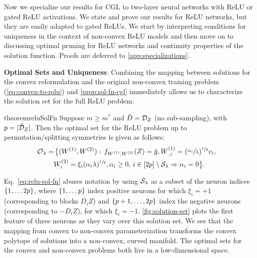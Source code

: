 


Now we specialize our results for CGL to two-layer neural networks
with ReLU or gated ReLU activations.
We state and prove our results for ReLU networks, but they are easily
adapted to gated ReLUs.
We start by interpreting conditions for uniqueness in the context
of non-convex ReLU models and then move on to discussing optimal pruning
for ReLU networks and continuity properties of the solution function.
Proofs are deferred to \cref{app:specializations}.

\textbf{Optimal Sets and Uniqueness}:
Combining the mapping between solutions for the convex reformulation
and the original non-convex training problem (\cref{eq:convex-to-relu})
and \cref{prop:sol-fn-cgl}
immediately allows us to characterize the solution set
for the full ReLU problem:
\begin{restatable}{theorem}{reluSolFn}\label{cor:relu-sol-fn}
    Suppose \( m \geq m^* \) and \( \tilde D = \mathcal{D}_Z \) (no sub-sampling),
    with \( p = |\tilde {\mathcal{D}}_Z| \).
    Then the optimal set for the ReLU problem up to permutation/splitting
    symmetries is given as follows:
    \begin{equation}\label{eq:relu-sol-fn}
        \begin{aligned}
            \hspace{-0.5em} \mathcal{O}_\lambda
            = & \,
            \big\{
            (W^{(1)},  W^{(2)}) :
            \, f_{W^{(1)}, W^{(2)}}(Z)  =  \hat y,
            W^{(1)}_{\cdot, i} = (\sfrac{\alpha_{i}}{\lambda})^{\sfrac{1}{2}} v_i, \\
              & W^{(2)}_{i} = \xi_i (\alpha_i \lambda)^{\sfrac{1}{2}},
            \alpha_i \geq 0, \, i \in [2p] \setminus \mathcal{S}_\lambda \Rightarrow \alpha_i = 0
            \big\}.
        \end{aligned}
    \end{equation}
\end{restatable}
Eq.~\eqref{eq:relu-sol-fn} abuses notation by using $\mathcal{S}_\lambda$ as
a subset of the neuron indices \( \left\{1, \ldots 2p\right\} \), where
\( \left\{1, \ldots p\right\} \) index positive neurons for which \( \xi_i = +1 \)
(corresponding to blocks \( D_i Z \))
and \( \left\{p+1, \ldots, 2p\right\} \) index the negative neurons (corresponding to \(
- D_i Z \)), for which \( \xi_i = -1 \).
\cref{fig:solution-set} plots the first feature of three neurons
as they vary over this solution set.
We see that the mapping from convex to non-convex parameterization transforms
the convex polytope of solutions into a non-convex, curved manifold.
The optimal sets for the convex and non-convex problems both live in a
low-dimensional space.

